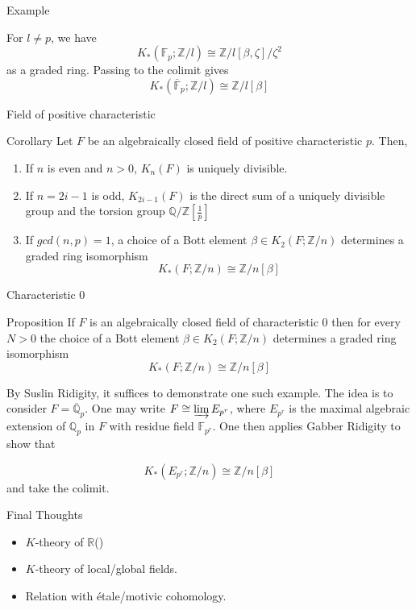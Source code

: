 \documentclass{beamer}
\begin{document}
\begin{frame}{Example}


\begin{theorem}[Browder, 78]
For $l\neq p$, we have 
\[K_*(\mathbb{F}_p; \mathbb{Z}/l)\cong \mathbb{Z}/l[\beta,\zeta]/\zeta^2\]
as a graded ring. Passing to the colimit gives
\[K_*(\overline{\mathbb{F}}_p; \mathbb{Z}/l)\cong \mathbb{Z}/l[\beta]\]
\end{theorem}
\end{frame}





\begin{frame}{Field of positive characteristic}
 \begin{block}{Corollary}
Let $F$ be an algebraically closed field of positive characteristic $p$. Then,
\begin{enumerate}
  \item If $n$ is even and $n>0$, $K_n(F)$ is uniquely divisible.
  \item If $n=2i-1$ is odd, $K_{2i-1}(F)$ is the direct sum of a uniquely divisible group and the torsion group $\mathbb{Q}/\mathbb{Z}[\frac{1}{p}]$
  \item If $gcd(n,p)=1$, a choice of a Bott element $\beta\in K_2(F; \mathbb{Z}/n)$ determines a graded ring isomorphism 
  \[K_*(F; \mathbb{Z}/n)\cong \mathbb{Z}/n[\beta] \]
\end{enumerate}




  
 \end{block}
\end{frame}


\begin{frame}{Characteristic 0}
\begin{block}{Proposition}
  If $F$ is an algebraically closed field of characteristic $0$ then for every $N>0$ the choice of a Bott element $\beta \in K_2(F;\mathbb{Z}/n)$ determines a graded ring isomorphism 
  \[K_*(F; \mathbb{Z}/n)\cong \mathbb{Z}/n[\beta] \]
\end{block}
By Suslin Ridigity, it suffices to demonstrate one such example. The idea is to consider $F=\overline{\mathbb{Q}}_p$. One may write $F\cong \varinjlim E_{p^r}$, where $E_{p^r}$ is the maximal algebraic extension of $\mathbb{Q}_p$
in $F$ with residue field $\mathbb{F}_{p^r}$. One then applies Gabber Ridigity to show that 

\[K_*(E_{p^r}; \mathbb{Z}/n)\cong \mathbb{Z}/n[\beta]\]
and take the colimit.

\end{frame}




\begin{frame}{Final Thoughts}

\begin{itemize}
  \item $K$-theory of $\mathbb{R}$()
  \item $K$-theory of local/global fields.
  \item Relation with \'etale/motivic cohomology.
\end{itemize}


  

\end{frame}
\end{document}
